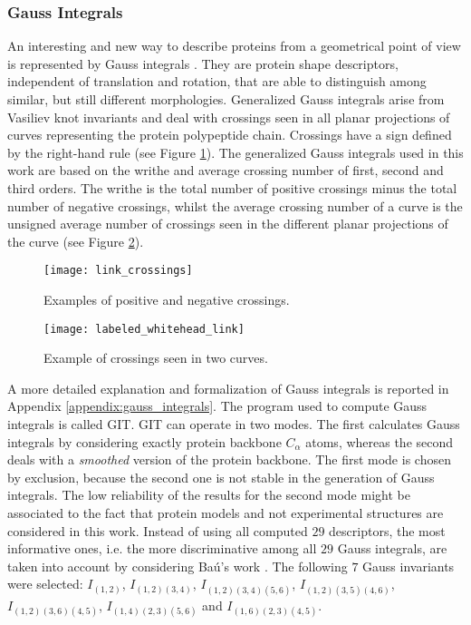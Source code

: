\subsubsection{Gauss Integrals}
\label{subsubsec:gauss_integrals}
An interesting and new way to describe proteins from a geometrical point of view is represented by Gauss integrals \cite{Rogen2005,Rogen2003,Rogen2003b}. They are protein shape descriptors, independent of translation and rotation, that are able to distinguish among similar, but still different morphologies. Generalized Gauss integrals arise from Vasiliev knot invariants and deal with crossings seen in all planar projections of curves representing the protein polypeptide chain. Crossings have a sign defined by the right-hand rule (see Figure \ref{fig:link_crossings}). The generalized Gauss integrals used in this work are based on the writhe and average crossing number of first, second and third orders. The writhe is the total number of positive crossings minus the total number of negative crossings, whilst the average crossing number of a curve is the unsigned average number of crossings seen in the different planar projections of the curve (see Figure \ref{fig:labeled_whitehead_link}).
\begin{figure}[tb]
	\begin{center}
		\texttt{[image: link\_crossings]}
		\caption[Positive and negative crossings]{Examples of positive and negative crossings.}
		\label{fig:link_crossings}
	\end{center}
\end{figure}
\begin{figure}[tb]
	\begin{center}
		\texttt{[image: labeled\_whitehead\_link]}
		\caption[Example of crossings seen in two curves]{Example of crossings seen in two curves.}
		\label{fig:labeled_whitehead_link}
	\end{center}
\end{figure}
A more detailed explanation and formalization of Gauss integrals is reported in Appendix \ref{appendix:gauss_integrals}.
The program used to compute Gauss integrals is called \gls{GIT}. GIT can operate in two modes. The first calculates Gauss integrals by considering exactly protein backbone $C_\alpha$ atoms, whereas the second deals with a \emph{smoothed} version of the protein backbone. The first mode is chosen by exclusion, because the second one is not stable in the generation of Gauss integrals. The low reliability of the results for the second mode might be associated to the fact that protein models and not experimental structures are considered in this work. 
Instead of using all computed $29$ descriptors, the most informative ones, i.e. the more discriminative among all $29$ Gauss integrals, are taken into account by considering Ba\'{u}'s work \cite{Bau2008}. The following $7$ Gauss invariants were selected: $I_{(1,2)}$, $I_{(1,2)(3,4)}$, $I_{(1,2)(3,4)(5,6)}$, $I_{(1,2)(3,5)(4,6)}$, $I_{(1,2)(3,6)(4,5)}$, $I_{(1,4)(2,3)(5,6)}$ and $I_{(1,6)(2,3)(4,5)}$. 



